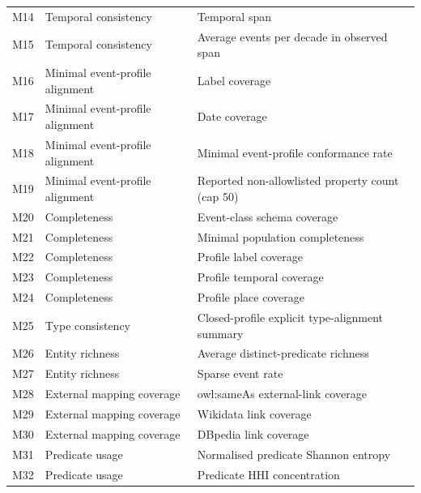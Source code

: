 \begin{longtable}{p{}p{}p{}}
M14 & Temporal consistency & Temporal span \\
M15 & Temporal consistency & Average events per decade in observed span \\
M16 & Minimal event-profile alignment & Label coverage \\
M17 & Minimal event-profile alignment & Date coverage \\
M18 & Minimal event-profile alignment & Minimal event-profile conformance rate \\
M19 & Minimal event-profile alignment & Reported non-allowlisted property count (cap 50) \\
M20 & Completeness & Event-class schema coverage \\
M21 & Completeness & Minimal population completeness \\
M22 & Completeness & Profile label coverage \\
M23 & Completeness & Profile temporal coverage \\
M24 & Completeness & Profile place coverage \\
M25 & Type consistency & Closed-profile explicit type-alignment summary \\
M26 & Entity richness & Average distinct-predicate richness \\
M27 & Entity richness & Sparse event rate \\
M28 & External mapping coverage & owl:sameAs external-link coverage \\
M29 & External mapping coverage & Wikidata link coverage \\
M30 & External mapping coverage & DBpedia link coverage \\
M31 & Predicate usage & Normalised predicate Shannon entropy \\
M32 & Predicate usage & Predicate HHI concentration \\
\end{longtable}

